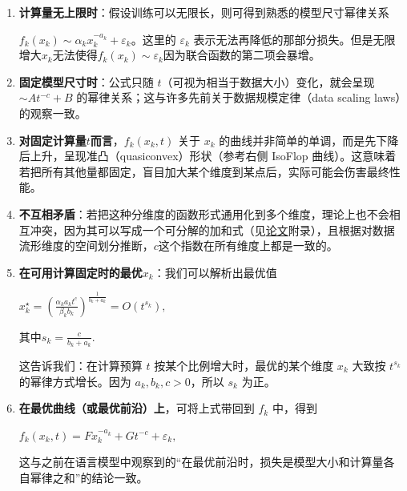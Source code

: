 \documentclass[zihao=false,fontset=windows]{ctexart}
\newcommand{\bigmath}[1]{%
  \begin{center}\large$\displaystyle #1$\end{center}%
}
\begin{document}
\begin{enumerate}

\item \textbf{计算量无上限时}：假设训练可以无限长，则可得到熟悉的模型尺寸幂律关系

$f_k(x_k)\sim\alpha_kx_k^{-a_k}+\varepsilon_k$。这里的 $\varepsilon_k$ 表示无法再降低的那部分损失。但是无限增大$x_k$无法使得$f_k(x_k)\sim\varepsilon_k$因为联合函数的第二项会暴增。\par

\item \textbf{固定模型尺寸时}：公式只随 $t$（可视为相当于数据大小）变化，就会呈现 $\sim At^{-c}+B$ 的幂律关系；这与许多先前关于数据规模定律（data scaling laws）的观察一致。

\item \textbf{对固定计算量}$t$\textbf{而言}，$f_k(x_k,t)$ 关于 $x_k$ 的曲线并非简单的单调，而是先下降后上升，呈现准凸（quasiconvex）形状（参考右侧 IsoFlop 曲线）。这意味着若把所有其他量都固定，盲目加大某个维度到某点后，实际可能会伤害最终性能。

\item \textbf{不互相矛盾}：若把这种分维度的函数形式通用化到多个维度，理论上也不会相互冲突，因为其可以写成一个可分解的加和式（见\href{https://arxiv.org/pdf/2305.13035}{论文}附录），且根据对数据流形维度的空间划分推断，$c$这个指数在所有维度上都是一致的。

\item \textbf{在可用计算固定时的最优}$x_k$：我们可以解析出最优值

\bigmath{x_k^\star=\left(\frac{\alpha_ka_kt^c}{\beta_kb_k}\right)^{\frac{1}{b_k+a_k}}=O(t^{s_k}),}

其中$s_k=\frac{c}{b_k+a_k}.$\par

这告诉我们：在计算预算 $t$ 按某个比例增大时，最优的某个维度 $x_k$ 大致按 $t^{s_k}$ 的幂律方式增长。因为 $a_k,b_k,c>0$，所以 $s_k$ 为正。\par

\item \textbf{在最优曲线（或最优前沿）上}，可将上式带回到 $f_k$ 中，得到

\bigmath{f_k(x_k,t)=Fx_k^{-a_k}+Gt^{-c}+\varepsilon_k,}

这与之前在语言模型中观察到的“在最优前沿时，损失是模型大小和计算量各自幂律之和”的结论一致。\par

\end{enumerate}

\par{}\vspace{1em}\par\vspace{0.28em}
\end{document}

